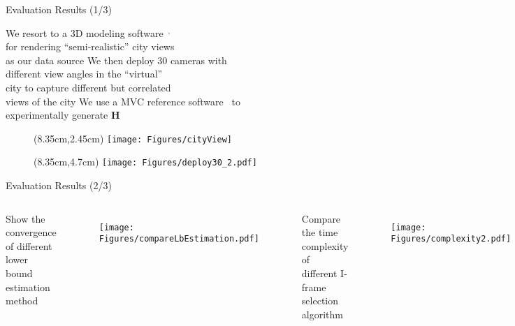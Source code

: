 \begin{frame}{Evaluation Results (1/3)}
\begin{itemize}
	\myItem We resort to a 3D modeling software~$^,$~ \\
			for rendering ``semi-realistic'' city views \\
			as our data source
	\myItem We then deploy $30$ cameras with \\
			different view angles in the ``virtual'' \\
			city to capture different but correlated \\
			views of the city
	\myItem We use a MVC reference software~ to \\
			experimentally generate $\mathbf{H}$
\end{itemize}
% 
\begin{figure}
\centering
\begin{textblock*}{1cm}(8.35cm,2.45cm) %
\texttt{[image: Figures/cityView]}
\end{textblock*}
\end{figure}
%
\begin{figure}
\centering
\begin{textblock*}{1cm}(8.35cm,4.7cm) %
\texttt{[image: Figures/deploy30\_2.pdf]}
\end{textblock*}
\end{figure}
%
\end{frame}
\begin{frame}{Evaluation Results (2/3)}
\begin{columns}
\begin{itemize}
	\myItem Show the convergence of different lower bound estimation method
\end{itemize}
\begin{figure}
\centering
\texttt{[image: Figures/compareLbEstimation.pdf]}
\end{figure}
%
\begin{itemize}
	\myItem Compare the time complexity of different I-frame selection algorithm
\end{itemize}
\begin{figure}
\centering
\texttt{[image: Figures/complexity2.pdf]}
\end{figure}
\end{columns}
%
\end{frame}
